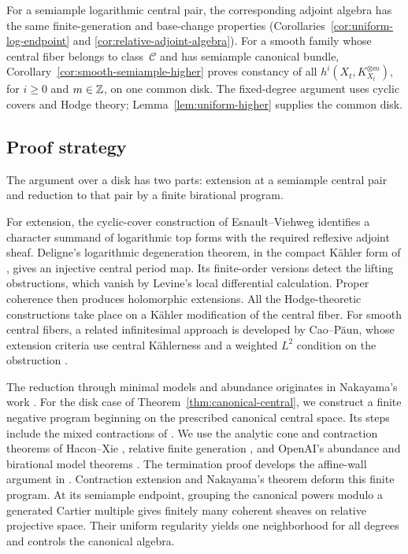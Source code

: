 \documentclass[11pt,a4paper]{article}
\numberwithin{equation}{section}
\theoremstyle{definition}
\theoremstyle{remark}
\begin{document}
For a semiample logarithmic central pair, the corresponding adjoint
algebra has the same finite-generation and base-change properties
(Corollaries~\ref{cor:uniform-log-endpoint} and
\ref{cor:relative-adjoint-algebra}). For a smooth family whose central
fiber belongs to class~$\mathcal C$ and has semiample canonical bundle,
Corollary~\ref{cor:smooth-semiample-higher} proves constancy of all
$h^i(X_t,K_{X_t}^{\otimes m})$, for $i\ge0$ and $m\in\mathbb Z$, on one
common disk. The fixed-degree argument uses cyclic covers and Hodge
theory; Lemma~\ref{lem:uniform-higher} supplies the common disk.

\subsection{Proof strategy}

The argument over a disk has two parts: extension at a semiample central pair and
reduction to that pair by a finite birational program.

For extension, the cyclic-cover construction of Esnault--Viehweg
\cite[Section~3]{EV1992} identifies a character summand of
logarithmic top forms with the required reflexive adjoint sheaf.
Deligne's logarithmic degeneration theorem, in the compact
Kähler form of \cite[Theorem~3.2]{LRW2019}, gives an injective
central period map.
Its finite-order versions detect the lifting obstructions, which
vanish by Levine's local differential calculation. Proper coherence
then produces holomorphic extensions. All the Hodge-theoretic
constructions take place on a Kähler modification of the central
fiber. For smooth central fibers, a related infinitesimal approach
is developed by Cao--Păun, whose extension criteria use central
Kählerness and a weighted $L^2$ condition on the obstruction
\cite[Theorems~1.1--1.2]{CaoPaun2023}.

The reduction through minimal models and abundance originates in
Nakayama's work \cite{Nakayama1986}. For the disk case of
Theorem~\ref{thm:canonical-central}, we construct a finite negative
program beginning on the prescribed canonical central space. Its
steps include the mixed contractions of
\cite[Definition~7]{Kollar2021}. We use the analytic cone and
contraction theorems of Hacon--Xie \cite{HX2026}, relative finite
generation \cite{Fujino2022}, and OpenAI's abundance and birational
model theorems \cite{OAI034}. The termination proof develops the
affine-wall argument in \cite[proof of Theorem~3.13]{OAI034}.
Contraction extension and Nakayama's theorem deform this finite
program. At its semiample endpoint, grouping the canonical powers
modulo a generated Cartier multiple gives finitely many coherent
sheaves on relative projective space. Their uniform regularity
yields one neighborhood for all degrees and controls the canonical
algebra.
\end{document}
